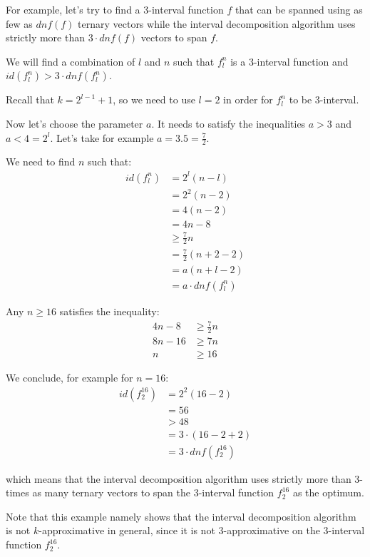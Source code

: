 \begin{example}
\label{example:3inthard}
For example,
let's try to find a $3$-interval function $f$
that can be spanned using
as few as
$\mathit{dnf}(f)$ ternary vectors
while the interval decomposition algorithm uses
strictly more than $3 \cdot \mathit{dnf}(f)$ vectors
to span $f$.

We will find a combination of $l$ and $n$
such that $f_l^n$ is a $3$-interval function
and
$id(f_l^n) > 3 \cdot \mathit{dnf}(f_l^n)$.

Recall that $k = 2^{l-1}+1$,
so we need to use $l = 2$
in order for $f_l^n$ to be $3$-interval.

Now let's choose the parameter $a$.
It needs to satisfy the inequalities $a > 3$
and $a < 4 = 2^l$.
Let's take for example $a = 3.5 = \frac{7}{2}$.

We need to find $n$ such that:
\begin{align*}
id(f_l^n) &= 2^l(n-l) \\
&= 2^2(n-2) \\
&= 4 (n-2) \\
&= 4n - 8 \\
&\geq \frac{7}{2} n \\
&= \frac{7}{2} (n+2-2) \\
&= a (n+l-2) \\
&= a \cdot \mathit{dnf}(f_l^n)
\end{align*}

Any $n \geq 16$ satisfies the inequality:
\begin{align*}
4n - 8 &\geq \frac{7}{2} n \\
8n - 16 &\geq 7n \\
n &\geq 16
\end{align*}

We conclude, for example for $n = 16$:
\begin{align*}
id(f_2^{16})
&= 2^2 (16 - 2) \\
&= 56 \\
&> 48 \\
&= 3 \cdot (16 - 2 + 2) \\
&= 3 \cdot \mathit{dnf}(f_2^{16})
\end{align*}

which means that the interval decomposition algorithm
uses strictly more
than $3$-times as many ternary vectors to span
the $3$-interval function
$f_2^{16}$ as the optimum.

Note that this example namely shows
that the interval decomposition algorithm
is not $k$-approximative in general,
since it is not $3$-approximative
on the $3$-interval function $f_2^{16}$.
\end{example}

